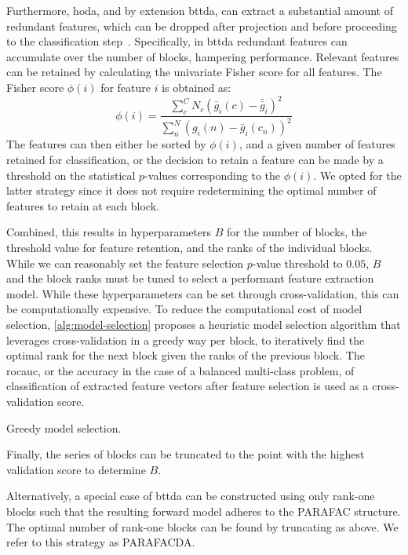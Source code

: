 \documentclass[10pt]{iopart}
\begin{document}
Furthermore, \ac{hoda}, and by extension \ac{bttda}, can extract a substantial amount
of redundant features, which can be dropped after projection and before proceeding to the classification
step~\cite{Phan2010}.
Specifically, in \ac{bttda} redundant features can accumulate over the number of
blocks, hampering performance.
Relevant features can be retained by calculating the
univariate Fisher score for all features.
The Fisher score $\phi(i)$ for feature $i$ is obtained as:
\begin{equation}
	\phi(i) = \frac
	{\sum_c^C N_c \left(\bar{g}_i(c)-\bar{\bar{g}}_i\right)^2}
	{\sum_n^N \left(g_i(n)-\bar{g}_i(c_n)\right)^2}
\end{equation}
The features can then either be sorted by $\phi(i)$, and a given number of
features retained for classification, or the decision to retain a feature can
be made by a threshold on the statistical $p$-values corresponding to the
$\phi(i)$.
We opted for the latter strategy since it does not require redetermining the
optimal number of features to retain at each block.

Combined, this results in hyperparameters $B$ for the number of blocks, the
threshold value for feature retention, and the ranks of the individual blocks.
While we can reasonably set the feature selection $p$-value threshold to $0.05$,
$B$ and the block ranks must be tuned to select a performant feature extraction
model.
While these hyperparameters can be set through cross-validation, this can be
computationally expensive.
To reduce the computational cost of model selection,
\cref{alg:model-selection} proposes a heuristic model selection
algorithm that leverages cross-validation in a greedy way per block, to
iteratively find the optimal rank for the next block given the ranks of the
previous block.
The \ac{rocauc}, or the accuracy in the case of a balanced multi-class problem,
of classification of extracted feature vectors after feature selection is used as
a cross-validation score.
\begin{algorithm}
  \caption[Greedy model selection procedure.]{Greedy model selection.}
	\label{alg:model-selection}
	
\end{algorithm}
Finally, the series of blocks can be truncated to the point with
the highest validation score to determine $B$.

Alternatively, a special case of \ac{bttda} can be constructed using only rank-one
blocks such that the resulting forward model adheres to the PARAFAC structure.
The optimal number of rank-one blocks can be found by truncating as above.
We refer to this strategy as PARAFACDA.
\end{document}
